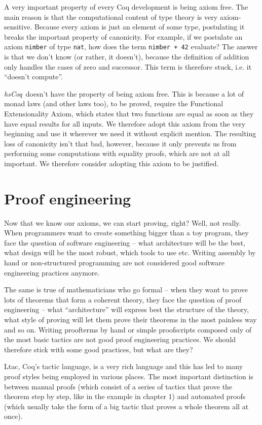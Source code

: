 \documentclass[declaration,inz,english,shortabstract]{iithesis}
\newcommand{\libname}{\textit{hsCoq}}
\newcommand{\m}[1]{\texttt{#1}}
\begin{document}
A very important property of every Coq development is being axiom free. The main reason is that the computational content of type theory is very axiom-sensitive. Because every axiom is just an element of some type, postulating it breaks the important property of canonicity. For example, if we postulate an axiom \m{nimber} of type \m{nat}, how does the term \m{nimber + 42} evaluate? The answer is that we don't know (or rather, it doesn't), because the definition of addition only handles the cases of zero and successor. This term is therefore stuck, i.e. it ``doesn't compute''.

\libname\ doesn't have the property of being axiom free. This is because a lot of monad laws (and other laws too), to be proved, require the Functional Extensionality Axiom, which states that two functions are equal as soon as they have equal results for all inputs. We therefore adopt this axiom from the very beginning and use it wherever we need it without explicit mention. The resulting loss of canonicity isn't that bad, however, because it only prevents us from performing some computations with equality proofs, which are not at all important. We therefore consider adopting this axiom to be justified.

\section{Proof engineering}

Now that we know our axioms, we can start proving, right? Well, not really. When programmers want to create something bigger than a toy program, they face the question of software engineering -- what architecture will be the best, what design will be the most robust, which tools to use etc. Writing assembly by hand or non-structured programming are not considered good software engineering practices anymore.

The same is true of mathematicians who go formal -- when they want to prove lots of theorems that form a coherent theory, they face the question of proof engineering -- what ``architecture'' will express best the structure of the theory, what style of proving will let them prove their theorems in the most painless way and so on. Writing proofterms by hand or simple proofscripts composed only of the most basic tactics are not good proof engineering practices. We should therefore stick with some good practices, but what are they?

Ltac, Coq's tactic language, is a very rich language and this has led to many proof styles being employed in various places. The most important distinction is between manual proofs (which consist of a series of tactics that prove the theorem step by step, like in the example in chapter 1) and automated proofs (which usually take the form of a big tactic that proves a whole theorem all at once).
\end{document}
